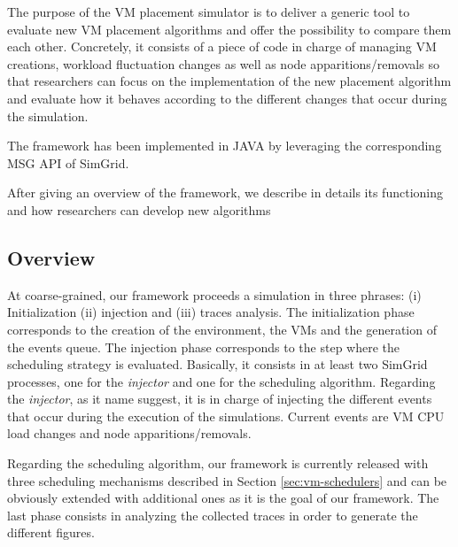 \documentclass[conference]{IEEEtran}
\newcommand{\sg}{SimGrid\xspace}
\begin{document}
The purpose of the VM placement simulator is to deliver a generic tool
to evaluate new VM placement algorithms and offer the possibility to
compare them each other. Concretely, it consists of  a piece of code in charge of managing VM
creations, workload fluctuation changes as well as node apparitions/removals so
that researchers can focus on the implementation of the new placement
algorithm and evaluate how it behaves according to the different
changes that occur during the simulation.

The framework has been implemented in JAVA by leveraging the
corresponding MSG API of \sg.

After giving an overview of the framework, we describe in details its
functioning and how researchers can develop new algorithms

\subsection{Overview}
At coarse-grained, our framework proceeds a simulation  in three phrases: (i) Initialization  (ii)
injection and (iii) traces analysis. The initialization phase corresponds to
the creation of the environment, the VMs and the generation of the
events queue. The injection phase corresponds to the step where the
scheduling strategy is evaluated. Basically, it consists in at least
two \sg processes, one for the \emph{injector} and one for the scheduling
algorithm.  Regarding the \emph{injector}, as it name suggest, it is in charge of injecting the different events that occur
during the execution of the simulations. Current events are VM CPU load
changes and  node apparitions/removals.

Regarding the scheduling algorithm,  our framework is currently
released with three scheduling mechanisms described in Section
\ref{sec:vm-schedulers} and can be obviously extended with additional
ones as it is the goal of our framework.
The last phase consists in analyzing the collected traces in order to generate the
different figures.
\end{document}
